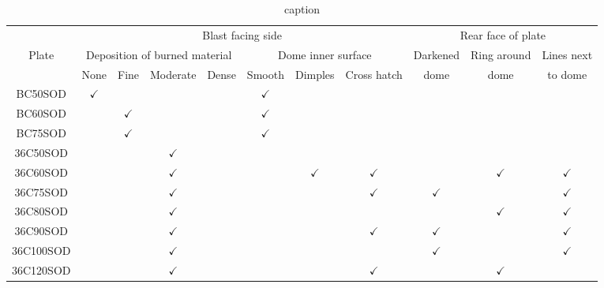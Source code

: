 \begin{table*}[!h]\centering 
    \begin{tabular}{|c|  c  c  c  c  c   c  c | c  c  c| }
        \toprule
        & \multicolumn{7}{|c|}{Blast facing side} & \multicolumn{3}{c|}{Rear face of plate}\\ 
        Plate & \multicolumn{4}{|c}{Deposition of burned material} & \multicolumn{3}{c|}{Dome inner surface} & Darkened & Ring around & Lines next \\ 
        & None & Fine & Moderate & Dense & Smooth & Dimples & Cross hatch & dome & dome & to dome \\ 
        \midrule
        BC50SOD & $\checkmark$ &  &  &  & $\checkmark$ &  &  &  &  &  \\ 
        BC60SOD &  & $\checkmark$ &  &  & $\checkmark$ &  &  &  &  &  \\ 
        BC75SOD &  & $\checkmark$ &  &  & $\checkmark$ &  &  &  &  &  \\ 
        36C50SOD &  &  & $\checkmark$ &  &  &  &  &  &  &  \\ 
        36C60SOD &  &  & $\checkmark$  &   &  & $\checkmark$ & $\checkmark$ &  & $\checkmark$  & $\checkmark$ \\ 
        36C75SOD &  &  & $\checkmark$ &  &  &  & $\checkmark$  & $\checkmark$ &  & $\checkmark$  \\ 
        36C80SOD & &  & $\checkmark$ &  &  &  &  &  & $\checkmark$ & $\checkmark$ \\ 
        36C90SOD & &  & $\checkmark$ &  &  &  & $\checkmark$ & $\checkmark$ &  & $\checkmark$ \\ 
        36C100SOD & &  & $\checkmark$ &  &  &  &  & $\checkmark$ &  & $\checkmark$ \\ 
        36C120SOD & &  & $\checkmark$ &  &  &  & $\checkmark$ &  & $\checkmark$ &  \\ 
        \bottomrule
    \end{tabular} 
    \caption{caption} 
    \label{tab:restults} 
\end{table*}
